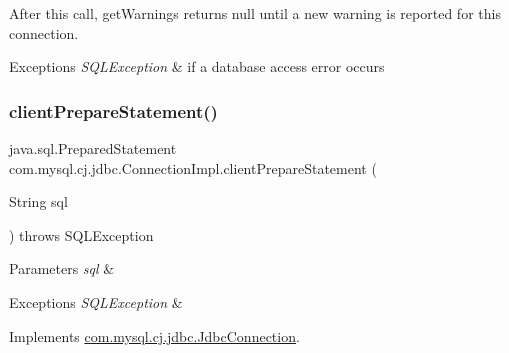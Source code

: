 After this call, get\+Warnings returns null until a new warning is reported for this connection.


\begin{DoxyExceptions}{Exceptions}
{\em S\+Q\+L\+Exception} & if a database access error occurs \\
\hline
\end{DoxyExceptions}
\mbox{\label{classcom_1_1mysql_1_1cj_1_1jdbc_1_1_connection_impl_a97fe5e29bb844493eb31b4f1c48d8bc7}} 
\subsubsection{\texorpdfstring{client\+Prepare\+Statement()}{clientPrepareStatement()}\hspace{0.1cm}{\footnotesize\ttfamily [1/6]}}
{\footnotesize\ttfamily java.\+sql.\+Prepared\+Statement com.\+mysql.\+cj.\+jdbc.\+Connection\+Impl.\+client\+Prepare\+Statement (\begin{DoxyParamCaption}\item[{String}]{sql }\end{DoxyParamCaption}) throws S\+Q\+L\+Exception}


\begin{DoxyParams}{Parameters}
{\em sql} & \\
\hline
\end{DoxyParams}

\begin{DoxyExceptions}{Exceptions}
{\em S\+Q\+L\+Exception} & \\
\hline
\end{DoxyExceptions}


Implements \mbox{\hyperlink{interfacecom_1_1mysql_1_1cj_1_1jdbc_1_1_jdbc_connection_a62db1ccf7a070833775481acb5e9e359}{com.\+mysql.\+cj.\+jdbc.\+Jdbc\+Connection}}.

\mbox{\label{classcom_1_1mysql_1_1cj_1_1jdbc_1_1_connection_impl_ac15baa66a2fe559cb558a0afd9c7cc03}} 
